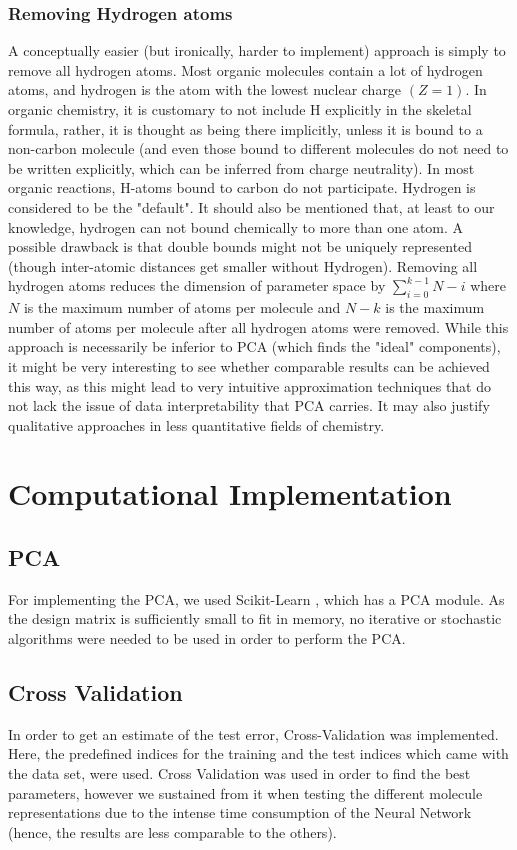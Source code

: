 \documentclass[11pt,a4paper,notitlepage]{article}
\begin{document}
\subsubsection{Removing Hydrogen atoms}
A conceptually easier (but ironically, harder to implement) approach is simply to remove all hydrogen atoms. Most organic molecules contain a lot of hydrogen atoms, and hydrogen is the atom with the lowest nuclear charge $(Z=1)$. In organic chemistry, it is customary to not include H explicitly in the skeletal formula, rather, it is thought as being there implicitly, unless it is bound to a non-carbon molecule (and even those bound to different molecules do not need to be written explicitly, which can be inferred from charge neutrality). In most organic reactions, H-atoms bound to carbon do not participate. Hydrogen is considered to be the "default". It should also be mentioned that, at least to our knowledge, hydrogen can not bound chemically to more than one atom. A possible drawback is that double bounds might not be uniquely represented (though inter-atomic distances get smaller without Hydrogen). Removing all hydrogen atoms reduces the dimension of parameter space by $\sum_{i=0}^{k-1}N-i$ where $N$ is the maximum number of atoms per molecule and $N-k$ is the maximum number of atoms per molecule after all hydrogen atoms were removed. While this approach is necessarily be inferior to PCA (which finds the "ideal" components), it might be very interesting to see whether comparable results can be achieved this way, as this might lead to very intuitive approximation techniques that do not lack the issue of data interpretability that PCA carries. It may also justify qualitative approaches in less quantitative fields of chemistry.  
\section{Computational Implementation}
\subsection{PCA}
For implementing the PCA, we used Scikit-Learn \citep{scikit-learn}, which has a PCA module. As the design matrix is sufficiently small to fit in memory, no iterative or stochastic algorithms were needed to be used in order to perform the PCA. 
\subsection{Cross Validation}
In order to get an estimate of the test error, Cross-Validation \citep{Project1} was implemented. Here, the predefined indices for the training and the test indices which came with the data set, were used. Cross Validation was used in order to find the best parameters, however we sustained from it when testing the different molecule representations due to the intense time consumption of the Neural Network (hence, the results are less comparable to the others). 
\end{document}
